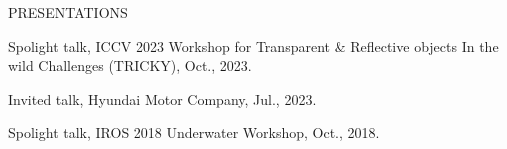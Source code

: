 \begin{rSection}{PRESENTATIONS}{}{}{}        
    \begin{rSubsection}{}{}{}{}    
        \item Spolight talk, ICCV 2023 Workshop for Transparent \& Reflective objects In the wild Challenges (TRICKY), Oct., 2023.
        \item Invited talk, Hyundai Motor Company, Jul., 2023.
        \item Spolight talk, IROS 2018 Underwater Workshop, Oct., 2018.
     \end{rSubsection}         
 \end{rSection}

